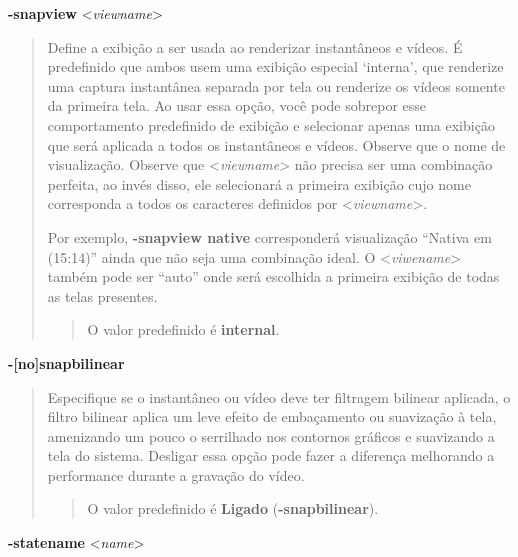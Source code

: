 \documentclass[letterpaper,10pt,brazil]{sphinxmanual}
\begin{document}
\label{commandline/commandline-all:mame-commandline-snapview}
\textbf{-snapview} \textless{}\emph{viewname}\textgreater{}
\begin{quote}

Define a exibição a ser usada ao renderizar instantâneos e vídeos.
É predefinido que ambos usem uma exibição especial `interna', que
renderize uma captura instantânea separada por tela ou renderize
os vídeos somente da primeira tela. Ao usar essa opção, você
pode sobrepor esse comportamento predefinido de exibição e
selecionar apenas uma exibição que será aplicada a todos os
instantâneos e vídeos. Observe que o nome de visualização.
Observe que \textless{}\emph{viewname}\textgreater{} não precisa ser uma combinação perfeita,
ao invés disso, ele selecionará a primeira exibição cujo nome
corresponda a todos os caracteres definidos por \textless{}\emph{viewname}\textgreater{}.

Por exemplo, \textbf{-snapview native} corresponderá visualização
``Nativa em (15:14)'' ainda que não seja uma combinação ideal.
O \textless{}\emph{viwename}\textgreater{} também pode ser ``auto'' onde será escolhida a primeira
exibição de todas as telas presentes.
\begin{quote}

O valor predefinido é \textbf{internal}.
\end{quote}
\end{quote}
\label{commandline/commandline-all:mame-commandline-nosnapbilinear}
\textbf{-{[}no{]}snapbilinear}
\begin{quote}

Especifique se o instantâneo ou vídeo deve ter filtragem bilinear
aplicada, o filtro bilinear aplica um leve efeito de embaçamento ou
suavização à tela, amenizando um pouco o serrilhado nos contornos
gráficos e suavizando a tela do sistema. Desligar essa opção pode
fazer a diferença melhorando a performance durante a gravação do
vídeo.
\begin{quote}

O valor predefinido é \textbf{Ligado} (\textbf{-snapbilinear}).
\end{quote}
\end{quote}
\label{commandline/commandline-all:mame-commandline-statename}
\textbf{-statename} \textless{}\emph{name}\textgreater{}
\end{document}
